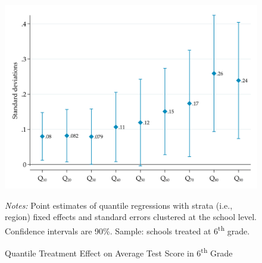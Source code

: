 \documentclass[11pt,a4paper]{article}
\begin{document}
\begin{figure}[htbp]
    
    \caption{Quantile Treatment Effect on Average Test Score  in 6\textsuperscript{th} Grade}
    \label{fig:qreg_media_grade6}
    \centering
    \includegraphics[width=14cm]{DataWork/Output/Figures/figA6-qreg_media_grade6.png}
    
    \begin{minipage}{0.825\textwidth}
        \small{\textit{Notes:} Point estimates of quantile regressions with strata (i.e., region) fixed effects and standard errors clustered at the school level. Confidence intervals are 90\%. Sample: schools treated at 6\textsuperscript{th} grade.}
    \end{minipage}
\end{figure}
\end{document}
